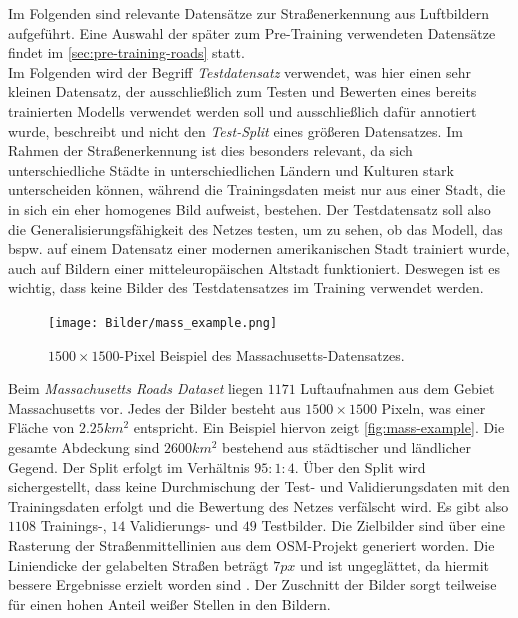 Im Folgenden sind relevante Datensätze zur Straßenerkennung aus Luftbildern aufgeführt. 
Eine Auswahl der später zum Pre-Training verwendeten Datensätze findet im \autoref{sec:pre-training-roads} statt.\\
Im Folgenden wird der Begriff \textit{Testdatensatz} verwendet, was hier einen sehr kleinen Datensatz, 
der ausschließlich zum Testen und Bewerten eines bereits 
trainierten Modells verwendet werden soll und ausschließlich dafür annotiert wurde, beschreibt 
und nicht den \textit{Test-Split} eines größeren Datensatzes. 
Im Rahmen der Straßenerkennung ist dies besonders relevant, 
da sich unterschiedliche Städte in unterschiedlichen Ländern und Kulturen stark unterscheiden können, 
während die Trainingsdaten meist nur aus einer Stadt, die in sich ein eher homogenes Bild aufweist, bestehen.
Der Testdatensatz soll also die Generalisierungsfähigkeit des Netzes testen, um zu sehen,
ob das Modell, das bspw. auf einem Datensatz einer modernen amerikanischen Stadt trainiert wurde, 
auch auf Bildern einer mitteleuropäischen Altstadt funktioniert. Deswegen ist es wichtig, 
dass keine Bilder des Testdatensatzes im Training verwendet werden. 

\begin{figure}
	\centering
	\vspace{-20pt} %
	\texttt{[image: Bilder/mass\_example.png]}
	\vspace{-5pt}
	\caption[$1500\times 1500$-Pixel Beispiel des Massachusetts-Datensatzes.]{\unskip}
	$1500\times 1500$-Pixel Beispiel des Massachusetts-Datensatzes.
	\label{fig:mass-example}
\end{figure}

Beim \textit{Massachusetts Roads Dataset} liegen $1171$ Luftaufnahmen aus dem Gebiet Massachusetts vor.
Jedes der Bilder besteht aus $1500\times 1500$ Pixeln, was einer Fläche von $2.25 km^2$ entspricht.
Ein Beispiel hiervon zeigt \autoref{fig:mass-example}.
Die gesamte Abdeckung sind $2600 km^2$ bestehend aus städtischer und ländlicher Gegend.
Der Split erfolgt im Verhältnis $95:1:4$. 
Über den Split wird sichergestellt, dass keine Durchmischung der Test- und Validierungsdaten mit den Trainingsdaten erfolgt und die Bewertung des Netzes verfälscht wird.
Es gibt also $1108$ Trainings-, $14$ Validierungs- und $49$ Testbilder.
Die Zielbilder sind über eine Rasterung der Straßenmittellinien aus dem \ac{OSM}-Projekt generiert worden.
Die Liniendicke der gelabelten Straßen beträgt $7 px$ und ist ungeglättet, da hiermit bessere Ergebnisse erzielt worden sind \cite{.06.04.2014}.
Der Zuschnitt der Bilder sorgt teilweise für einen hohen Anteil weißer Stellen in den Bildern.

